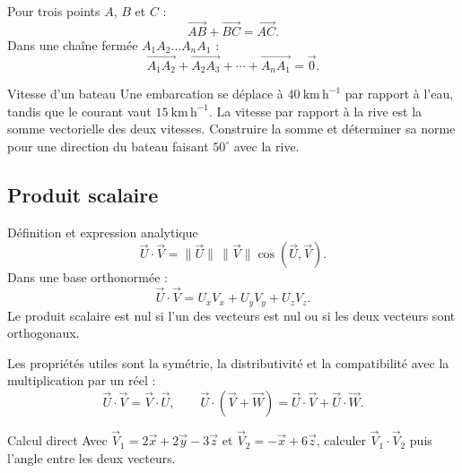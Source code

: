 Pour trois points $A$, $B$ et $C$ :
\[
\boxed{\overrightarrow{AB}+\overrightarrow{BC}=\overrightarrow{AC}.}
\]
Dans une chaîne fermée $A_1A_2\ldots A_nA_1$ :
\[
\boxed{\overrightarrow{A_1A_2}+\overrightarrow{A_2A_3}+
\cdots+\overrightarrow{A_nA_1}=\vec0.}
\]

\begin{TLThreeApp}{Vitesse d'un bateau}
Une embarcation se déplace à $40\ \mathrm{km\,h^{-1}}$ par rapport à
l'eau, tandis que le courant vaut $15\ \mathrm{km\,h^{-1}}$. La vitesse
par rapport à la rive est la somme vectorielle des deux vitesses.
Construire la somme et déterminer sa norme pour une direction du bateau
faisant $50^\circ$ avec la rive.
\end{TLThreeApp}

\subsection{Produit scalaire}

\begin{TLThreeDef}{Définition et expression analytique}
\[
\vec U\cdot\vec V=\|\vec U\|\,\|\vec V\|\cos(\vec U,\vec V).
\]
Dans une base orthonormée :
\[
\boxed{\vec U\cdot\vec V=U_xV_x+U_yV_y+U_zV_z.}
\]
Le produit scalaire est nul si l'un des vecteurs est nul ou si les deux
vecteurs sont orthogonaux.
\end{TLThreeDef}

Les propriétés utiles sont la symétrie, la distributivité et la
compatibilité avec la multiplication par un réel :
\[
\vec U\cdot\vec V=\vec V\cdot\vec U,
\qquad
\vec U\cdot(\vec V+\vec W)=\vec U\cdot\vec V+\vec U\cdot\vec W.
\]

\begin{TLThreeApp}{Calcul direct}
Avec
$\vec V_1=2\vec x+2\vec y-3\vec z$ et
$\vec V_2=-\vec x+6\vec z$, calculer
$\vec V_1\cdot\vec V_2$ puis l'angle entre les deux vecteurs.
\end{TLThreeApp}
